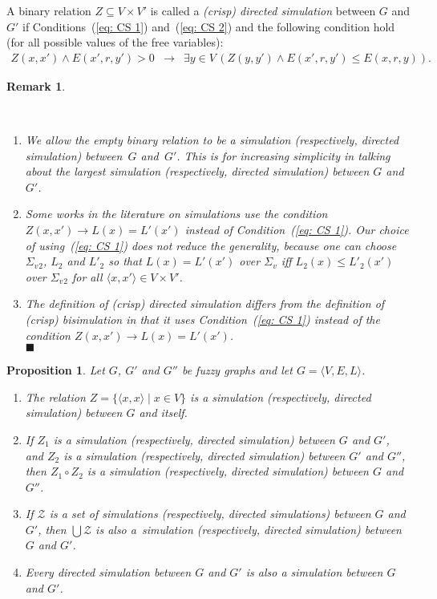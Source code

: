 \documentclass[11pt]{article}
\def\tuple#1{\langle#1\rangle}
\def\eqref#1{(\ref{#1})}
\newcommand{\E}{\exists}
\newcommand{\mZ}{\mathcal{Z}}
\newcommand{\fALC}{$\mathit{f}\!\mathcal{ALC}$\xspace}
\newcommand{\myend}{\mbox{}\hfill{\footnotesize$\blacksquare$}}
\newcommand{\SV}{\Sigma_v}
\newtheorem{proposition}[theorem]{Proposition}
\newtheorem{Remark}[theorem]{Remark}
\newenvironment{remark}{\begin{Remark}\begin{em}}{\end{em}\end{Remark}}
\begin{document}
A binary relation $Z \subseteq V \times V'$ is called a {\em (crisp) directed simulation} between $G$ and $G'$ if Conditions~\eqref{eq: CS 1} and~\eqref{eq: CS 2} and the following condition hold (for all possible values of the free variables): 
\begin{eqnarray}
Z(x,x') \land E(x',r,y') > 0 & \to & \E y \in V\,(Z(y,y') \land E(x',r,y') \leq E(x,r,y)). \label{eq: CS 3}
\end{eqnarray}

\begin{remark}\ 
\begin{enumerate}
\item We allow the empty binary relation to be a simulation (respectively, directed simulation) between~$G$ and~$G'$. This is for increasing simplicity in talking about the largest simulation (respectively, directed simulation) between $G$ and~$G'$. 
\item Some works in the literature on simulations use the condition \mbox{$Z(x,x') \to L(x) = L'(x')$} instead of Condition~\eqref{eq: CS 1}. Our choice of using~\eqref{eq: CS 1} does not reduce the generality, because one can choose ${\SV}\!_2$, $L_2$ and $L'_2$ so that $L(x) = L'(x')$ over $\SV$ iff $L_2(x) \leq L'_2(x')$ over ${\SV}\!_2$ for all $\tuple{x,x'} \in V \times V'$. 
\item The definition of (crisp) directed simulation differs from the definition of (crisp) bisimulation in that it uses Condition~\eqref{eq: CS 1} instead of the condition \mbox{$Z(x,x') \to L(x) = L'(x')$}.\\ 
\myend
\end{enumerate}
\end{remark}


\begin{proposition}\label{prop: HGDFJ}
Let $G$, $G'$ and $G''$ be fuzzy graphs and let $G = \tuple{V, E, L}$. 
\begin{enumerate}
\item The relation $Z = \{\tuple{x,x} \mid x \in V\}$ is a simulation (respectively, directed simulation) between $G$ and itself.
\item If $Z_1$ is a simulation (respectively, directed simulation) between $G$ and $G'$, and $Z_2$ is a simulation (respectively, directed simulation) between $G'$ and $G''$, then $Z_1 \circ Z_2$ is a simulation (respectively, directed simulation) between $G$ and~$G''$.
\item If $\mZ$ is a set of simulations (respectively, directed simulations) between $G$ and $G'$, then $\bigcup\mZ$ is also a~simulation (respectively, directed simulation) between $G$ and $G'$.
\item Every directed simulation between $G$ and $G'$ is also a simulation between $G$ and $G'$.
\end{enumerate}   
\end{proposition}
\end{document}
